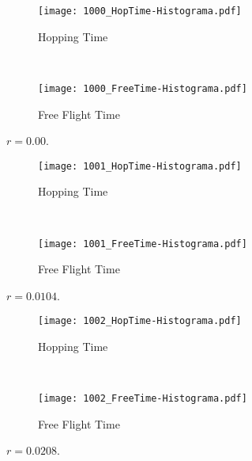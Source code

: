 \documentclass[a4paper,10pt]{article}
\begin{document}
\begin{figure}[h]
        \centering
        \begin{subfigure}[b]{0.45\textwidth}
                \centering
                \texttt{[image: 1000\_HopTime-Histograma.pdf]}
                \caption{Hopping Time}              
        \end{subfigure}%
        ~ %
        \begin{subfigure}[b]{0.45\textwidth}
                \centering
                \texttt{[image: 1000\_FreeTime-Histograma.pdf]}
                \caption{Free Flight Time}                
        \end{subfigure}       
        \caption{ $r=0.00$. }
\end{figure}



\begin{figure}[h]
        \centering
        \begin{subfigure}[b]{0.45\textwidth}
                \centering
                \texttt{[image: 1001\_HopTime-Histograma.pdf]}
                \caption{Hopping Time}              
        \end{subfigure}%
        ~ %
        \begin{subfigure}[b]{0.45\textwidth}
                \centering
                \texttt{[image: 1001\_FreeTime-Histograma.pdf]}
                \caption{Free Flight Time}                
        \end{subfigure}       
        \caption{ $r=0.0104$. }
\end{figure}

 


\begin{figure}[h]
        \centering
        \begin{subfigure}[b]{0.45\textwidth}
                \centering
                \texttt{[image: 1002\_HopTime-Histograma.pdf]}
                \caption{Hopping Time}              
        \end{subfigure}%
        ~ %
        \begin{subfigure}[b]{0.45\textwidth}
                \centering
                \texttt{[image: 1002\_FreeTime-Histograma.pdf]}
                \caption{Free Flight Time}                
        \end{subfigure}       
        \caption{ $r=0.0208$. }
\end{figure}
\end{document}
